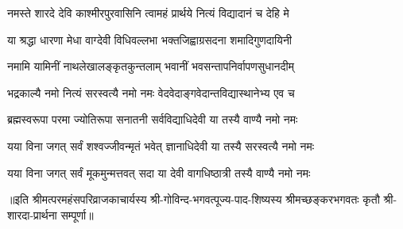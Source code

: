 

\twolineshloka
{नमस्ते शारदे देवि काश्मीरपुरवासिनि}
{त्वामहं प्रार्थये नित्यं विद्यादानं च देहि मे}

\twolineshloka
{या श्रद्धा धारणा मेधा वाग्देवी विधिवल्लभा}
{भक्तजिह्वाग्रसदना शमादिगुणदायिनी}

\twolineshloka
{नमामि यामिनीं नाथलेखालङ्कृतकुन्तलाम्}
{भवानीं भवसन्तापनिर्वापणसुधानदीम्}

\twolineshloka
{भद्रकाल्यै नमो नित्यं सरस्वत्यै नमो नमः}
{वेदवेदाङ्गवेदान्तविद्यास्थानेभ्य एव च}

\twolineshloka
{ब्रह्मस्वरूपा परमा ज्योतिरूपा सनातनी}
{सर्वविद्याधिदेवी या तस्यै वाण्यै नमो नमः}

\twolineshloka
{यया विना जगत् सर्वं शश्वज्जीवन्मृतं भवेत्}
{ज्ञानाधिदेवी या तस्यै सरस्वत्यै नमो नमः}

\twolineshloka
{यया विना जगत् सर्वं मूकमुन्मत्तवत् सदा}
{या देवी वागधिष्ठात्री तस्यै वाण्यै नमो नमः}

॥इति श्रीमत्परमहंसपरिव्राजकाचार्यस्य श्री-गोविन्द-भगवत्पूज्य-पाद-शिष्यस्य
श्रीमच्छङ्करभगवतः कृतौ श्री-शारदा-प्रार्थना सम्पूर्णा॥
